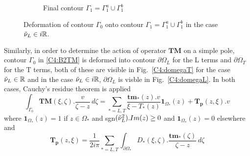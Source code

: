 \begin{figure}
\begin{subfigure}[b]{0.45\textwidth}
\caption{Final contour $\Gamma_1=\Gamma_1^a \cup \Gamma_1^b$}
\end{subfigure}
\caption{Deformation of contour $\Gamma_0$ onto contour $\Gamma_1=\Gamma_1^a \cup \Gamma_1^b$ in the case $\tilde{\nu}_L \in i\mathbb{R}$.}
\label{C4:gamma1cr}
\end{figure}

Similarly, in order to determine the action of operator $\mathbf{TM}$ on a simple pole, contour $\Gamma_0$ in \eqref{C4:B2TM} is deformed into contour $\partial \Omega_L$ for the L terms and $\partial \Omega_T$ for the T terms, both of these are visible in Fig.~\ref{C4:domegaT} for the case $\tilde{\nu}_L \in \mathbb{R}$ and in the case $\tilde{\nu}_L \in i\mathbb{R}$, $\partial \Omega_L$ is visble in Fig.~\ref{C4:domegaL}. In both cases, Cauchy's residue theorem is applied
\begin{equation}
\int_{\Gamma_0} \textbf{TM}(\xi,\zeta).\frac{v}{\zeta-z}\,d\zeta = \sum_{*=L,T} \frac{\textbf{tm}_*(z).v}{\xi-T_*(z)}\textbf{1}_{\Omega_*}(z)+\mathbf{T_p}(z,\xi).v
\label{C4:GaussTM}
\end{equation}
where $\textbf{1}_{\Omega_*}(z)=1$ if $z\in \Omega_*$ and sgn$(\tilde{\nu}_L^2).Im(z) \geq 0$ and $\textbf{1}_{\Omega_*}(z)=0$ elsewhere and
\begin{equation}
\mathbf{T_p}(z,\xi)= \frac{1}{2i\pi} \sum_{*=L,T} \int_{\partial \Omega_*} D_*(\xi,\zeta) .\dfrac{\textbf{tm}_*(\zeta)}{\zeta-z}\, d\zeta
\end{equation}


